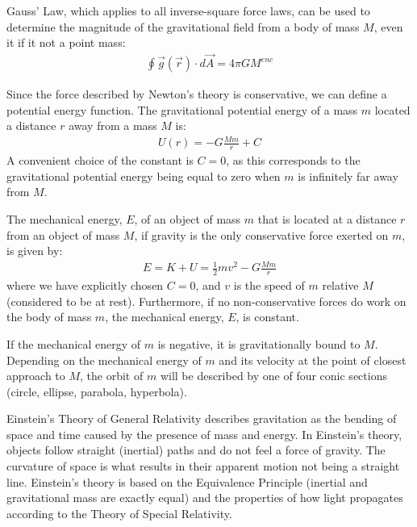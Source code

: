\begin{chapterSummary}
Gauss' Law, which applies to all inverse-square force laws, can be used to determine the magnitude of the gravitational field from a body of mass $M$, even it if it not a point mass:
\begin{align*}
\oint \vec g(\vec r) \cdot d\vec A = 4\pi G M^{enc}
\end{align*}

Since the force described by Newton's theory is conservative, we can define a potential energy function. The gravitational potential energy of a mass $m$ located a distance $r$ away from a mass $M$ is:
\begin{align*}
U(r) = -G\frac{Mm}{r} + C
\end{align*}
A convenient choice of the constant is $C=0$, as this corresponds to the gravitational potential energy being equal to zero when $m$ is infinitely far away from $M$.

The mechanical energy, $E$, of an object of mass $m$ that is located at a distance $r$ from an object of mass $M$, if gravity is the only conservative force exerted on $m$, is given by:
\begin{align*}
E = K + U = \frac{1}{2}mv^2 - G\frac{Mm}{r}
\end{align*}
where we have explicitly chosen $C=0$, and $v$ is the speed of $m$ relative $M$ (considered to be at rest). Furthermore, if no non-conservative forces do work on the body of mass $m$, the mechanical energy, $E$, is constant.

If the mechanical energy of $m$ is negative, it is gravitationally bound to $M$. Depending on the mechanical energy of $m$ and its velocity at the point of closest approach to $M$, the orbit of $m$ will be described by one of four conic sections (circle, ellipse, parabola, hyperbola).

Einstein's Theory of General Relativity describes gravitation as the bending of space and time caused by the presence of mass and energy. In Einstein's theory, objects follow straight (inertial) paths and do not feel a force of gravity. The curvature of space is what results in their apparent motion not being a straight line. Einstein's theory is based on the Equivalence Principle (inertial and gravitational mass are exactly equal) and the properties of how light propagates according to the Theory of Special Relativity.
\end{chapterSummary}
\newpage
